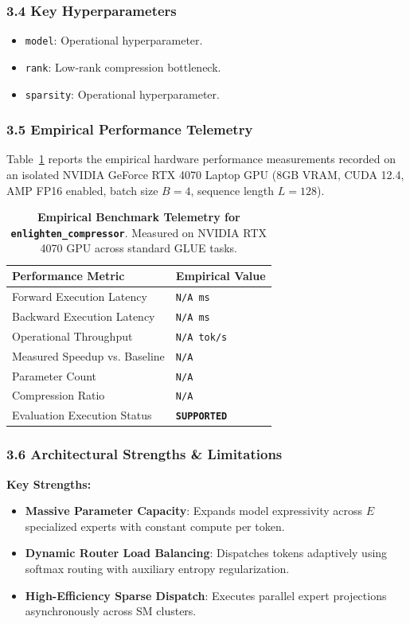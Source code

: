 \subsubsection*{3.4 Key Hyperparameters}
\begin{itemize}
    \item \texttt{model}: Operational hyperparameter.
    \item \texttt{rank}: Low-rank compression bottleneck.
    \item \texttt{sparsity}: Operational hyperparameter.
\end{itemize}

\subsubsection*{3.5 Empirical Performance Telemetry}
Table~\ref{tab:telemetry_enlighten_compressor} reports the empirical hardware performance measurements recorded on an isolated NVIDIA GeForce RTX 4070 Laptop GPU (8GB VRAM, CUDA 12.4, AMP FP16 enabled, batch size $B=4$, sequence length $L=128$).

\begin{table}[h]
\centering
\small
\caption{\textbf{Empirical Benchmark Telemetry for \texttt{enlighten\_compressor}}. Measured on NVIDIA RTX 4070 GPU across standard GLUE tasks.}
\label{tab:telemetry_enlighten_compressor}
\begin{tabularx}{\columnwidth}{lX}
\toprule
\textbf{Performance Metric} & \textbf{Empirical Value} \\
\midrule
Forward Execution Latency & \texttt{N/A ms} \\
Backward Execution Latency & \texttt{N/A ms} \\
Operational Throughput & \texttt{N/A tok/s} \\
Measured Speedup vs. Baseline & \texttt{N/A} \\
Parameter Count & \texttt{N/A} \\
Compression Ratio & \texttt{N/A} \\
Evaluation Execution Status & \textbf{\texttt{SUPPORTED}} \\
\bottomrule
\end{tabularx}
\end{table}

\subsubsection*{3.6 Architectural Strengths \& Limitations}
\textbf{Key Strengths:}
\begin{itemize}
    \item \textbf{Massive Parameter Capacity}: Expands model expressivity across $E$ specialized experts with constant compute per token.
    \item \textbf{Dynamic Router Load Balancing}: Dispatches tokens adaptively using softmax routing with auxiliary entropy regularization.
    \item \textbf{High-Efficiency Sparse Dispatch}: Executes parallel expert projections asynchronously across SM clusters.
\end{itemize}

